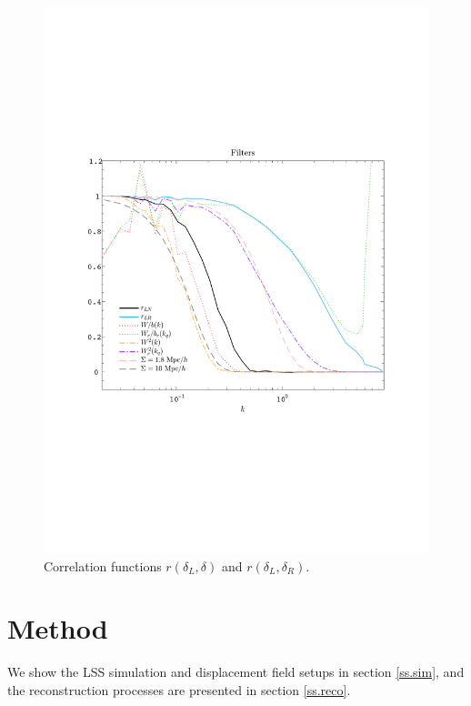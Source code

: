 \documentclass[aps,prd,twocolumn,superscriptaddress,amsfont,amssymb,amsmath,nofootinbib,showpacs,balancelastpage]{revtex4-1}
\begin{document}
\begin{figure}[t] \centering
  \includegraphics[width=1.0\linewidth]{fig2.pdf}
  \caption{Correlation functions $r(\delta_L,\delta)$ and $r(\delta_L,\delta_R)$.}
  \label{fig.2}
\end{figure}

\section{Method}\label{sec.method}
We show the LSS simulation and displacement field setups in section \ref{ss.sim},
and the reconstruction processes are presented in section \ref{ss.reco}.
\end{document}
